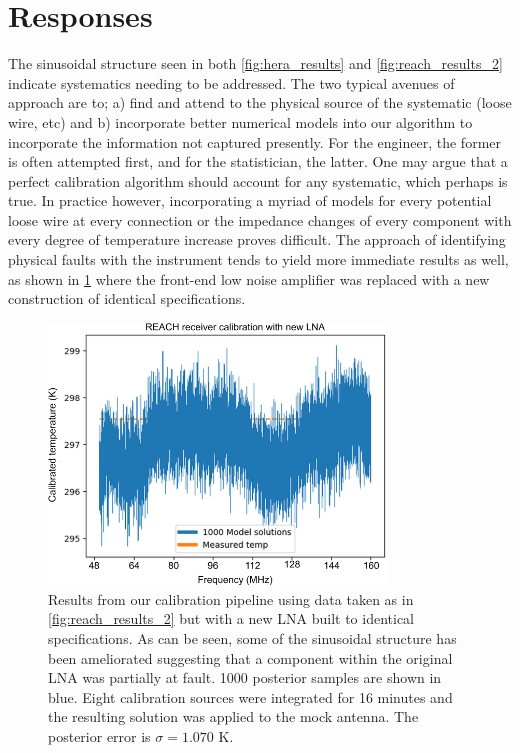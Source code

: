 \section{Responses}
The sinusoidal structure seen in both \cref{fig:hera_results} and \cref{fig:reach_results_2} indicate systematics needing to be addressed. The two typical avenues of approach are to; a) find and attend to the physical source of the systematic (loose wire, etc) and b) incorporate better numerical models into our algorithm to incorporate the information not captured presently. For the engineer, the former is often attempted first, and for the statistician, the latter. One may argue that a perfect calibration algorithm should account for any systematic, which perhaps is true. In practice however, incorporating a myriad of models for every potential loose wire at every connection or the impedance changes of every component with every degree of temperature increase proves difficult. The approach of identifying physical faults with the instrument tends to yield more immediate results as well, as shown in \cref{fig:lna_switched_reach_result} where the front-end low noise amplifier was replaced with a new construction of identical specifications.
\begin{figure}
    \centering
    \includegraphics[width=0.8\textwidth]{lna_switched_reach_result}
    \caption{Results from our calibration pipeline using data taken as in \cref{fig:reach_results_2} but with a new LNA built to identical specifications. As can be seen, some of the sinusoidal structure has been ameliorated suggesting that a component within the original LNA was partially at fault. 1000 posterior samples are shown in blue. Eight calibration sources were integrated for 16 minutes and the resulting solution was applied to the mock antenna. The posterior error is $\sigma = 1.070$ K.}
    \label{fig:lna_switched_reach_result}
\end{figure}


